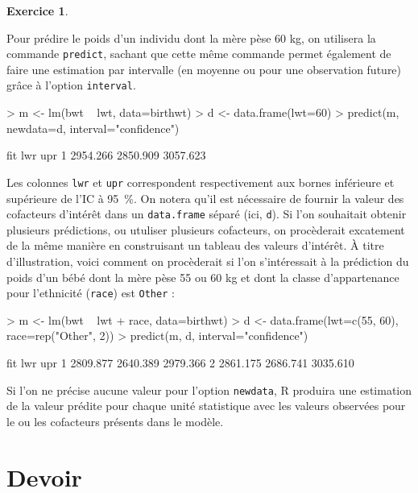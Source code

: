 \documentclass[11pt]{report}
\theoremstyle{definition}
\newtheorem{exo}{Exercice}[chapter]
\begin{document}
\begin{exo}
\begin{sol}
Pour prédire le poids d'un individu dont la mère pèse 60 kg, on utilisera la
commande \texttt{predict}, sachant que cette même commande permet également
de faire une estimation par intervalle (en moyenne ou pour une observation
future) grâce à l'option \texttt{interval}.
\begin{Schunk}
\begin{Sinput}
> m <- lm(bwt ~ lwt, data=birthwt)
> d <- data.frame(lwt=60)
> predict(m, newdata=d, interval="confidence") 
\end{Sinput}
\begin{Soutput}
       fit      lwr      upr
1 2954.266 2850.909 3057.623
\end{Soutput}
\end{Schunk}
Les colonnes \texttt{lwr} et \texttt{upr} correspondent respectivement aux
bornes inférieure et supérieure de l'IC à 95~\%.
On notera qu'il est nécessaire de fournir la valeur des cofacteurs
d'intérêt dans un \texttt{data.frame} séparé (ici, \texttt{d}). Si l'on
souhaitait obtenir plusieurs prédictions, ou utuliser plusieurs cofacteurs,
on procèderait excatement de la même manière en construisant un tableau des
valeurs d'intérêt. À titre d'illustration, voici comment on procèderait si
l'on s'intéressait à la prédiction du poids d'un bébé dont la mère pèse 55
ou 60 kg et dont la classe d'appartenance pour l'ethnicité (\texttt{race})
est \texttt{Other} :
\begin{Schunk}
\begin{Sinput}
> m <- lm(bwt ~ lwt + race, data=birthwt)
> d <- data.frame(lwt=c(55, 60), race=rep("Other", 2))
> predict(m, d, interval="confidence")
\end{Sinput}
\begin{Soutput}
       fit      lwr      upr
1 2809.877 2640.389 2979.366
2 2861.175 2686.741 3035.610
\end{Soutput}
\end{Schunk}
Si l'on ne précise aucune valeur pour l'option \texttt{newdata}, R produira
une estimation de la valeur prédite pour chaque unité statistique avec les
valeurs observées pour le ou les cofacteurs présents dans le modèle.
\end{sol}
\end{exo}

\chapter*{Devoir }
\end{document}

